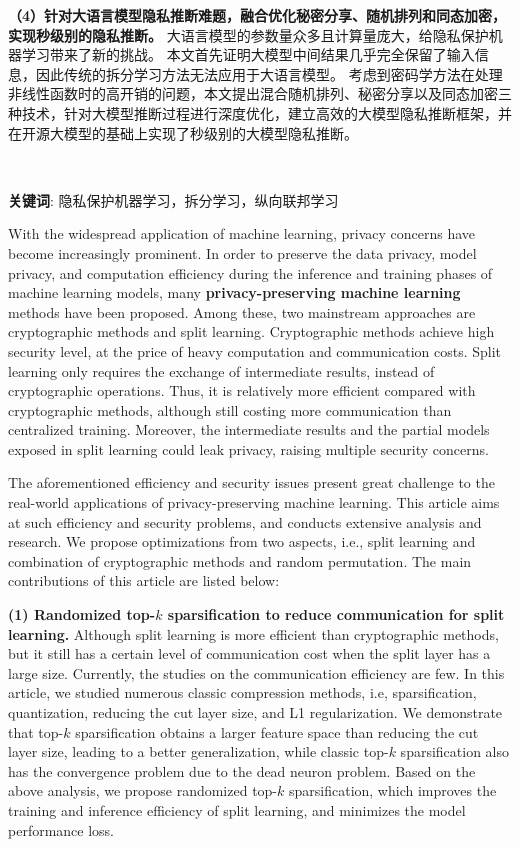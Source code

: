 \textbf{（4）针对大语言模型隐私推断难题，融合优化秘密分享、随机排列和同态加密，实现秒级别的隐私推断。}
大语言模型的参数量众多且计算量庞大，给隐私保护机器学习带来了新的挑战。
本文首先证明大模型中间结果几乎完全保留了输入信息，因此传统的拆分学习方法无法应用于大语言模型。
考虑到密码学方法在处理非线性函数时的高开销的问题，本文提出混合随机排列、秘密分享以及同态加密三种技术，针对大模型推断过程进行深度优化，建立高效的大模型隐私推断框架，并在开源大模型的基础上实现了秒级别的大模型隐私推断。

~

\noindent \textbf{关键词}: 隐私保护机器学习，拆分学习，纵向联邦学习


\cleardoublepage
{}
With the widespread application of machine learning, privacy concerns have become increasingly prominent.
In order to preserve the data privacy, model privacy, and computation efficiency during the inference and training phases of machine learning models, many \textbf{privacy-preserving machine learning} methods have been proposed.
%
Among these, two mainstream approaches are cryptographic methods and split learning.
%
Cryptographic methods achieve high security level, at the price of heavy computation and communication costs.
%
Split learning only requires the exchange of intermediate results, instead of cryptographic operations.
Thus, it is relatively more efficient compared with cryptographic methods, although still costing more communication than centralized training.
Moreover, the intermediate results and the partial models exposed in split learning could leak privacy, raising multiple security concerns.

The aforementioned efficiency and security issues present great challenge to the real-world applications of privacy-preserving machine learning.
%
This article aims at such efficiency and security problems, and conducts extensive analysis and research.
%
We propose optimizations from two aspects, i.e., split learning and combination of cryptographic methods and random permutation.
%
The main contributions of this article are listed below:


\textbf{(1) Randomized top-$k$ sparsification to reduce communication for split learning.}
Although split learning is more efficient than cryptographic methods, but it still has a certain level of communication cost when the split layer has a large size.
Currently, the studies on the communication efficiency are few.
%
In this article, we studied numerous classic compression methods, i.e, sparsification, quantization, reducing the cut layer size, and L1 regularization.
%
We demonstrate that top-$k$ sparsification obtains a larger feature space than reducing the cut layer size, leading to a better generalization, while classic top-$k$ sparsification also has the convergence problem due to the dead neuron problem.
%
Based on the above analysis, we propose randomized top-$k$ sparsification, which improves the training and inference efficiency of split learning, and minimizes the model performance loss.
%

